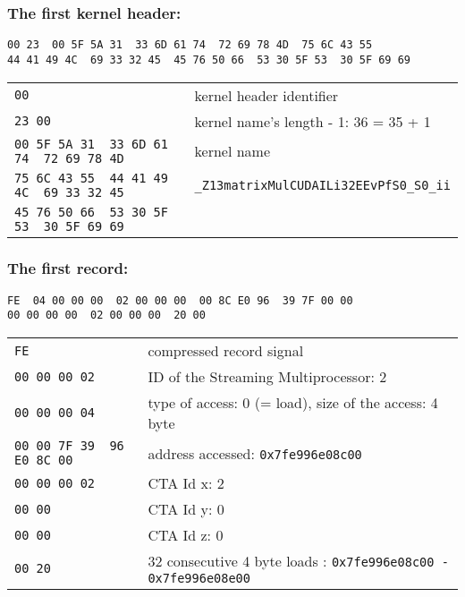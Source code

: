 \documentclass{scrartcl}
\begin{document}
\subsubsection*{The first kernel header:}
\begin{lstlisting}[numbers=none]
      00 23  00 5F 5A 31  33 6D 61 74  72 69 78 4D  75 6C 43 55
44 41 49 4C  69 33 32 45  45 76 50 66  53 30 5F 53  30 5F 69 69
\end{lstlisting}

\smallskip

\begin{tabular}{l|l}
\lstinline[]$00$ & kernel header identifier \\ 
\lstinline[]$23 00$ & kernel name’s length - 1: 36 = 35 + 1 \\ \hline
\lstinline[]$00 5F 5A 31  33 6D 61 74  72 69 78 4D$ & kernel name\\ 
\lstinline[]$75 6C 43 55  44 41 49 4C  69 33 32 45$ & \lstinline[]$_Z13matrixMulCUDAILi32EEvPfS0_S0_ii$ \\ 
\lstinline[]$45 76 50 66  53 30 5F 53  30 5F 69 69$ & 
\end{tabular}

\bigskip

\subsubsection*{The first record:}
\begin{lstlisting}[numbers=none]
         FE  04 00 00 00  02 00 00 00  00 8C E0 96  39 7F 00 00
00 00 00 00  02 00 00 00  20 00
\end{lstlisting}

\begin{tabular}{l|l}
\lstinline[]$FE$ & compressed record signal \\ 
\lstinline[]$00 00 00 02$ & ID of the Streaming Multiprocessor: 2 \\
\lstinline[]$00 00 00 04$ &  type of access: 0 (= load), size of the access: 4 byte \\
\lstinline[]$00 00 7F 39  96 E0 8C 00$ & address accessed: \lstinline[]$0x7fe996e08c00$ \\
\lstinline[]$00 00 00 02$ & CTA Id x: 2 \\
\lstinline[]$00 00$ & CTA Id y: 0 \\
\lstinline[]$00 00$ & CTA Id z: 0 \\
\lstinline[]$00 20$ & 32 consecutive 4 byte loads : \lstinline[]$0x7fe996e08c00 - 0x7fe996e08e00$
\end{tabular}
\end{document}
